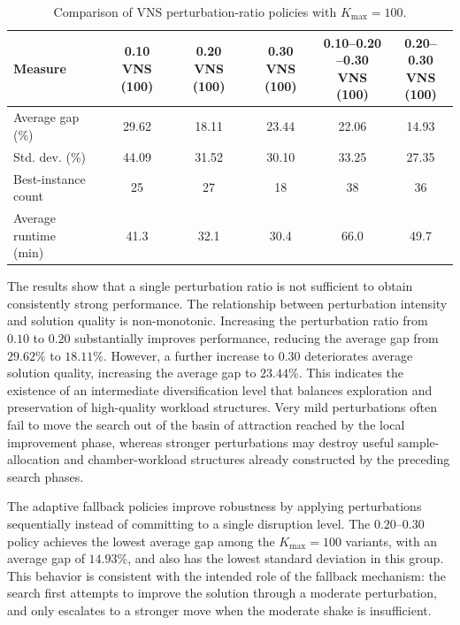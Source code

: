 \begin{table}[H]
\centering
\caption{Comparison of VNS perturbation-ratio policies with \(K_{\max}=100\).}
\label{tab:vns_ratio_comparison}
\small
\begin{tabular}{lccccc}
\hline
\textbf{Measure}
&
\shortstack{\textbf{0.10}\\\textbf{VNS (100)}}
&
\shortstack{\textbf{0.20}\\\textbf{VNS (100)}}
&
\shortstack{\textbf{0.30}\\\textbf{VNS (100)}}
&
\shortstack{\textbf{0.10--0.20}\\\textbf{--0.30}\\\textbf{VNS (100)}}
&
\shortstack{\textbf{0.20--0.30}\\\textbf{VNS}\\\textbf{(100)}} \\
\hline
Average gap (\%) & 29.62 & 18.11 & 23.44 & 22.06 & 14.93 \\
Std. dev. (\%) & 44.09 & 31.52 & 30.10 & 33.25 & 27.35 \\
\shortstack[l]{Best-instance\\count} & 25 & 27 & 18 & 38 & 36 \\
\shortstack[l]{Average runtime\\(min)} & 41.3 & 32.1 & 30.4 & 66.0 & 49.7 \\
\hline
\end{tabular}
\end{table}

The results show that a single perturbation ratio is not sufficient to obtain consistently strong performance. The relationship between perturbation intensity and solution quality is non-monotonic. Increasing the perturbation ratio from \(0.10\) to \(0.20\) substantially improves performance, reducing the average gap from \(29.62\%\) to \(18.11\%\). However, a further increase to \(0.30\) deteriorates average solution quality, increasing the average gap to \(23.44\%\). This indicates the existence of an intermediate diversification level that balances exploration and preservation of high-quality workload structures. Very mild perturbations often fail to move the search out of the basin of attraction reached by the local improvement phase, whereas stronger perturbations may destroy useful sample-allocation and chamber-workload structures already constructed by the preceding search phases.

The adaptive fallback policies improve robustness by applying perturbations sequentially instead of committing to a single disruption level. The \(0.20\)--\(0.30\) policy achieves the lowest average gap among the \(K_{\max}=100\) variants, with an average gap of \(14.93\%\), and also has the lowest standard deviation in this group. This behavior is consistent with the intended role of the fallback mechanism: the search first attempts to improve the solution through a moderate perturbation, and only escalates to a stronger move when the moderate shake is insufficient.

